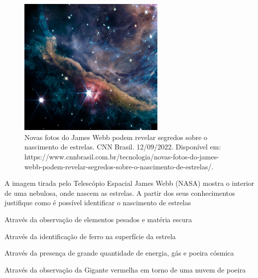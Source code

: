 \begin{figure}[htpb!]
\includegraphics[width=2.77865in,height=2.63750in]{./imgs/img13.jpg}
\caption{Novas fotos do James Webb podem revelar segredos sobre o nascimento de estrelas. CNN Brasil. 12/09/2022. Disponível em: https://www.cnnbrasil.com.br/tecnologia/novas-fotos-do-james-webb-podem-revelar-segredos-sobre-o-nascimento-de-estrelas/.}
\end{figure}

A imagem tirada pelo Telescópio Espacial James Webb (NASA) mostra o
interior de uma nebulosa, onde nascem as estrelas. A partir dos seus
conhecimentos justifique como é possível identificar o nascimento de
estrelas

\begin{escolha}
\item
  Através da observação de elementos pesados e matéria escura
\item
  Através da identificação de ferro na superfície da estrela
\item
  Através da presença de grande quantidade de energia, gás e poeira
  cósmica
\item
  Através da observação da Gigante vermelha em torno de uma nuvem de
  poeira
\end{escolha}


